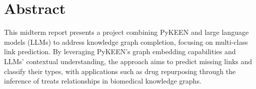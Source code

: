 \section*{Abstract}

This midterm report presents a project combining PyKEEN and large language models (LLMs) to address knowledge graph completion, focusing on multi-class link prediction. By leveraging PyKEEN's graph embedding capabilities and LLMs' contextual understanding, the approach aims to predict missing links and classify their types, with applications such as drug repurposing through the inference of treats relationships in biomedical knowledge graphs.
